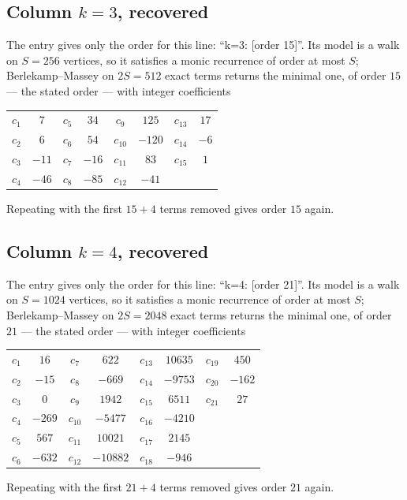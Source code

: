 \documentclass[11pt,a4paper]{article}
\theoremstyle{plain}
\theoremstyle{definition}
\begin{document}
\subsection*{Column $k=3$, recovered}
The entry gives only the order for this line: ``k=3: [order 15]''. Its model is a walk on
$S=256$ vertices, so it satisfies a monic recurrence of order at most $S$;
Berlekamp--Massey on $2S=512$ exact terms returns the minimal one, of order
$15$ --- the stated order --- with integer coefficients
\begin{center}\small\begin{tabular}{cccccccc}
$c_{1}$ & $7$ & $c_{5}$ & $34$ & $c_{9}$ & $125$ & $c_{13}$ & $17$ \\
$c_{2}$ & $6$ & $c_{6}$ & $54$ & $c_{10}$ & $-120$ & $c_{14}$ & $-6$ \\
$c_{3}$ & $-11$ & $c_{7}$ & $-16$ & $c_{11}$ & $83$ & $c_{15}$ & $1$ \\
$c_{4}$ & $-46$ & $c_{8}$ & $-85$ & $c_{12}$ & $-41$ &  &  \\
\end{tabular}\end{center}
Repeating with the first $15+4$ terms removed gives order $15$ again.

\subsection*{Column $k=4$, recovered}
The entry gives only the order for this line: ``k=4: [order 21]''. Its model is a walk on
$S=1024$ vertices, so it satisfies a monic recurrence of order at most $S$;
Berlekamp--Massey on $2S=2048$ exact terms returns the minimal one, of order
$21$ --- the stated order --- with integer coefficients
\begin{center}\small\begin{tabular}{cccccccc}
$c_{1}$ & $16$ & $c_{7}$ & $622$ & $c_{13}$ & $10635$ & $c_{19}$ & $450$ \\
$c_{2}$ & $-15$ & $c_{8}$ & $-669$ & $c_{14}$ & $-9753$ & $c_{20}$ & $-162$ \\
$c_{3}$ & $0$ & $c_{9}$ & $1942$ & $c_{15}$ & $6511$ & $c_{21}$ & $27$ \\
$c_{4}$ & $-269$ & $c_{10}$ & $-5477$ & $c_{16}$ & $-4210$ &  &  \\
$c_{5}$ & $567$ & $c_{11}$ & $10021$ & $c_{17}$ & $2145$ &  &  \\
$c_{6}$ & $-632$ & $c_{12}$ & $-10882$ & $c_{18}$ & $-946$ &  &  \\
\end{tabular}\end{center}
Repeating with the first $21+4$ terms removed gives order $21$ again.
\end{document}
